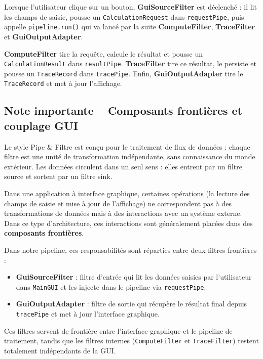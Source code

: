 \documentclass[12pt,a4paper]{article}
\begin{document}
Lorsque l'utilisateur clique sur un bouton, \textbf{GuiSourceFilter} est déclenché :
il lit les champs de saisie, pousse un \texttt{CalculationRequest} dans \texttt{requestPipe},
puis appelle \texttt{pipeline.run()} qui va lancé par la suite \textbf{ComputeFilter}, \textbf{TraceFilter} et \textbf{GuiOutputAdapter}.

\textbf{ComputeFilter} tire la requête, calcule le résultat et pousse un
\texttt{CalculationResult} dans \texttt{resultPipe}.
\textbf{TraceFilter} tire ce résultat, le persiste et pousse un \texttt{TraceRecord}
dans \texttt{tracePipe}.
Enfin, \textbf{GuiOutputAdapter} tire le \texttt{TraceRecord} et met à jour l'affichage.

\subsection*{\colorbox{yellow!30}{\textbf{Note importante -- Composants frontières et couplage GUI}}}

\noindent Le style Pipe \& Filtre est conçu pour le traitement de flux de données :
chaque filtre est une unité de transformation indépendante, sans connaissance du monde extérieur.
Les données circulent dans un seul sens : elles entrent par un filtre source et sortent par un filtre sink.

\medskip
\noindent Dans une application à interface graphique, certaines opérations
(la lecture des champs de saisie et mise à jour de l'affichage) ne correspondent
pas à des transformations de données mais à des interactions avec un système externe.
Dans ce type d'architecture, ces interactions sont généralement placées
dans des \textbf{composants frontières}.

\medskip
\noindent Dans notre pipeline, ces responsabilités sont réparties entre deux filtres frontières :

\begin{itemize}
  \item \textbf{GuiSourceFilter} : filtre d'entrée qui lit les données saisies
        par l'utilisateur dans \texttt{MainGUI} et les injecte dans le pipeline via
        \texttt{requestPipe}.
  \item \textbf{GuiOutputAdapter} : filtre de sortie qui récupère le résultat final
        depuis \texttt{tracePipe} et met à jour l'interface graphique.
\end{itemize}

\noindent Ces filtres servent de frontière entre l'interface graphique et le
pipeline de traitement, tandis que les filtres internes (\texttt{ComputeFilter} et
\texttt{TraceFilter}) restent totalement indépendants de la GUI.
\end{document}
